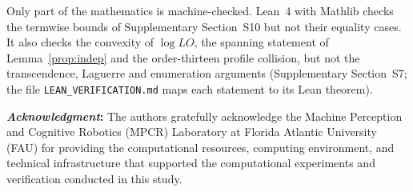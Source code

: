 \documentclass[a5paper, 10pt]{article}
\theoremstyle{plain}
\theoremstyle{remark}
\theoremstyle{definition}
\newcommand{\acknowledgment}[1]{\vspace{5mm}\singlespacing
	{\noindent\textbf{\textit{Acknowledgment\/}:} #1}
}
\begin{document}
Only part of the mathematics is machine-checked. Lean~4 with Mathlib
checks the termwise bounds of Supplementary Section~S10 but not their
equality cases. It also checks the convexity of $\log LO$, the spanning
statement of Lemma~\ref{prop:indep} and the order-thirteen profile
collision, but not the transcendence, Laguerre and enumeration arguments
(Supplementary Section~S7; the file \texttt{LEAN\_VERIFICATION.md} maps
each statement to its Lean theorem).

\acknowledgment{The authors gratefully acknowledge the Machine Perception and Cognitive Robotics (MPCR) Laboratory at Florida Atlantic University (FAU) for providing the computational resources, computing environment, and technical infrastructure that supported the computational experiments and verification conducted in this study.}

\singlespacing
\end{document}
